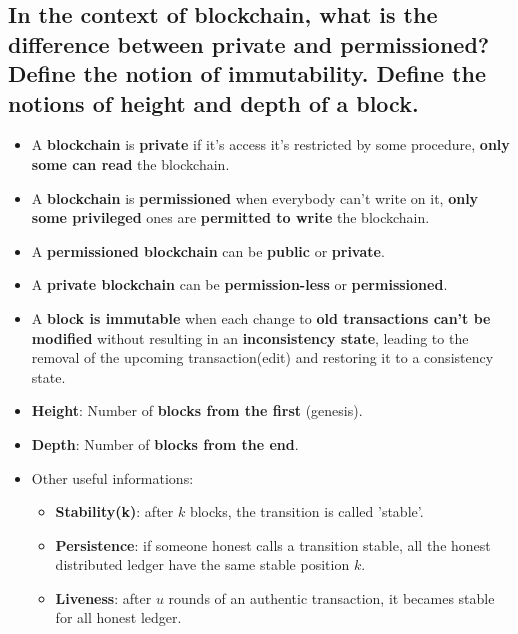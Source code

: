 \documentclass[9pt, letterpaper]{article}
\begin{document}
\subsection{In the context of blockchain, what is the difference between private and permissioned? Define the notion of immutability. Define the notions of height and depth of a block.}
\begin{itemize}
	\item A \textbf{blockchain} is \textbf{private} if it's access it's restricted by some procedure, \textbf{only some can read} the blockchain.
	\item A \textbf{blockchain} is \textbf{permissioned} when everybody can't write on it, \textbf{only some privileged} ones are \textbf{permitted to write} the blockchain.
	\item A \textbf{permissioned blockchain} can be \textbf{public} or \textbf{private}.
	\item A \textbf{private blockchain} can be \textbf{permission-less} or \textbf{permissioned}.
	\item A \textbf{block is immutable} when each change to \textbf{old transactions can't be modified} without resulting in an \textbf{inconsistency state}, leading to the removal of the upcoming transaction(edit) and restoring it to a consistency state.
	\item \textbf{Height}: Number of \textbf{blocks from the first} (genesis).
	\item \textbf{Depth}: Number of \textbf{blocks from the end}.
	\item Other useful informations:
	      \begin{itemize}
		      \item \textbf{Stability(k)}: after $k$ blocks, the transition is called 'stable'.
		      \item \textbf{Persistence}: if someone honest calls a transition stable, all the honest distributed ledger have the same stable position $k$.
		      \item \textbf{Liveness}: after $u$ rounds of an authentic transaction, it becames stable for all honest ledger.
	      \end{itemize}
\end{itemize}
\end{document}
